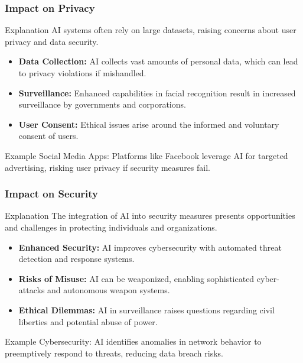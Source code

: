 \documentclass[aspectratio=169]{beamer}
\begin{document}
\begin{frame}[fragile]
    \frametitle{Impact on Privacy}
    \begin{block}{Explanation}
        AI systems often rely on large datasets, raising concerns about user privacy and data security.
    \end{block}

    \begin{itemize}
        \item \textbf{Data Collection:} AI collects vast amounts of personal data, which can lead to privacy violations if mishandled.
        \item \textbf{Surveillance:} Enhanced capabilities in facial recognition result in increased surveillance by governments and corporations.
        \item \textbf{User Consent:} Ethical issues arise around the informed and voluntary consent of users.
    \end{itemize}

    \begin{block}{Example}
        Social Media Apps: Platforms like Facebook leverage AI for targeted advertising, risking user privacy if security measures fail.
    \end{block}
\end{frame}

\begin{frame}[fragile]
    \frametitle{Impact on Security}
    \begin{block}{Explanation}
        The integration of AI into security measures presents opportunities and challenges in protecting individuals and organizations.
    \end{block}
    
    \begin{itemize}
        \item \textbf{Enhanced Security:} AI improves cybersecurity with automated threat detection and response systems.
        \item \textbf{Risks of Misuse:} AI can be weaponized, enabling sophisticated cyber-attacks and autonomous weapon systems.
        \item \textbf{Ethical Dilemmas:} AI in surveillance raises questions regarding civil liberties and potential abuse of power.
    \end{itemize}

    \begin{block}{Example}
        Cybersecurity: AI identifies anomalies in network behavior to preemptively respond to threats, reducing data breach risks.
    \end{block}
\end{frame}
\end{document}
